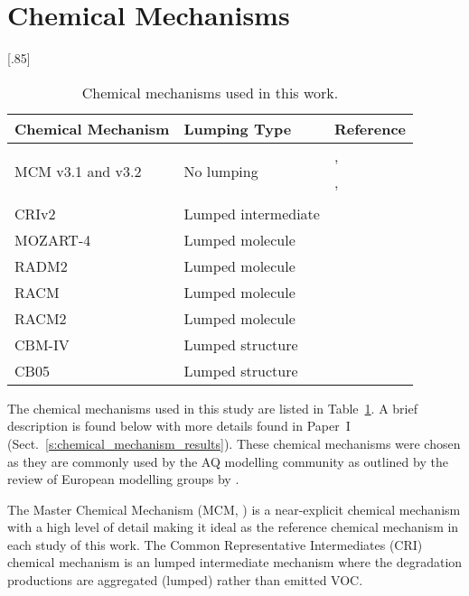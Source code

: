 \section{Chemical Mechanisms} \label{s:chemical_mechanisms}
\begin{table}[t]%
    \begin{center}%
        \caption{Chemical mechanisms used in this work.}%
        \scalebox{.85}[.85]{\begin{tabular}{lll}%
                \hline \hline
                \textbf{Chemical Mechanism} & \textbf{Lumping Type} & \textbf{Reference} \\
                \hline \hline
                \multirow{3}{*}{MCM v3.1 and v3.2} & \multirow{3}{*}{No lumping} & \citet{Jenkin:1997}, \citet{Jenkin:2003} \\
                & & \citet{Saunders:2003}, \citet{Bloss:2005} \\
                & & \citet{MCM_Site} \\
                CRIv2 & Lumped intermediate & \citet{Jenkin:2008} \\
                MOZART-4 & Lumped molecule & \citet{Emmons:2010} \\
                RADM2 & Lumped molecule & \citet{Stockwell:1990} \\
                RACM & Lumped molecule & \citet{Stockwell:1997} \\
                RACM2 & Lumped molecule & \citet{Goliff:2013} \\
                CBM-IV & Lumped structure & \citet{Gery:1989} \\
                CB05 & Lumped structure & \citet{Yarwood:2005} \\
                \hline \hline
            \end{tabular}%
        }%
        \label{t:mechanisms}%
    \end{center}%
\end{table}%
The chemical mechanisms used in this study are listed in Table~\ref{t:mechanisms}.
A brief description is found below with more details found in Paper~I (Sect.~\ref{s:chemical_mechanism_results}).
These chemical mechanisms were chosen as they are commonly used by the AQ modelling community as outlined by the review of European modelling groups by \citet{Baklanov:2014}.

The Master Chemical Mechanism (MCM, \citet{Jenkin:1997, Jenkin:2003, Saunders:2003, Bloss:2005, MCM_Site}) is a near-explicit chemical mechanism with a high level of detail making it ideal as the reference chemical mechanism in each study of this work.
The Common Representative Intermediates (CRI) chemical mechanism \citep{Jenkin:2008} is an lumped intermediate mechanism where the degradation productions are aggregated (lumped) rather than emitted VOC.

